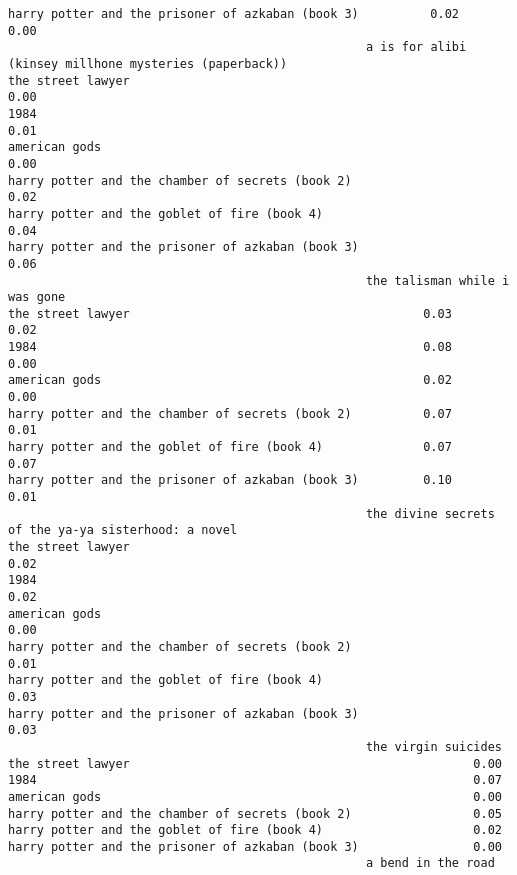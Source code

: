 \documentclass[
]{report}
\begin{document}
\begin{verbatim}
harry potter and the prisoner of azkaban (book 3)          0.02         0.00
                                                  a is for alibi (kinsey millhone mysteries (paperback))
the street lawyer                                                                                   0.00
1984                                                                                                0.01
american gods                                                                                       0.00
harry potter and the chamber of secrets (book 2)                                                    0.02
harry potter and the goblet of fire (book 4)                                                        0.04
harry potter and the prisoner of azkaban (book 3)                                                   0.06
                                                  the talisman while i was gone
the street lawyer                                         0.03             0.02
1984                                                      0.08             0.00
american gods                                             0.02             0.00
harry potter and the chamber of secrets (book 2)          0.07             0.01
harry potter and the goblet of fire (book 4)              0.07             0.07
harry potter and the prisoner of azkaban (book 3)         0.10             0.01
                                                  the divine secrets of the ya-ya sisterhood: a novel
the street lawyer                                                                                0.02
1984                                                                                             0.02
american gods                                                                                    0.00
harry potter and the chamber of secrets (book 2)                                                 0.01
harry potter and the goblet of fire (book 4)                                                     0.03
harry potter and the prisoner of azkaban (book 3)                                                0.03
                                                  the virgin suicides
the street lawyer                                                0.00
1984                                                             0.07
american gods                                                    0.00
harry potter and the chamber of secrets (book 2)                 0.05
harry potter and the goblet of fire (book 4)                     0.02
harry potter and the prisoner of azkaban (book 3)                0.00
                                                  a bend in the road

\end{verbatim}
\end{document}
